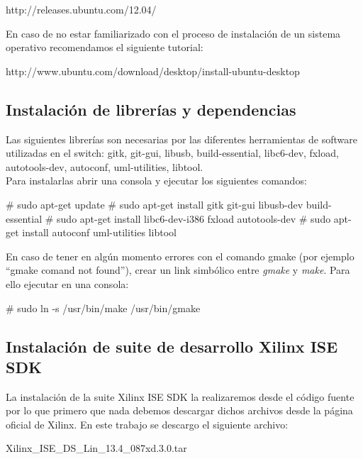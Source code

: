 \begin{center}
http://releases.ubuntu.com/12.04/
\end{center}  

En caso de no estar familiarizado con el proceso de instalación de un sistema operativo recomendamos el siguiente tutorial:

\begin{center}
http://www.ubuntu.com/download/desktop/install-ubuntu-desktop
\end{center}

\subsection{Instalación de librerías y dependencias}
Las siguientes librerías son necesarias por las diferentes herramientas de software utilizadas en el switch: gitk, git-gui, libusb, build-essential, libc6-dev, fxload, autotools-dev, autoconf, uml-utilities, libtool.\\

Para instalarlas abrir una consola y ejecutar los siguientes comandos:\\

\begin{bash}
# sudo apt-get update
# sudo apt-get install gitk git-gui libusb-dev build-essential 
# sudo apt-get install libc6-dev-i386 fxload autotools-dev
# sudo apt-get install autoconf uml-utilities libtool
\end{bash}

En caso de tener en algún momento errores con el comando gmake (por ejemplo “gmake comand not found”), crear un link simbólico entre \textit{gmake} y \textit{make}. Para ello ejecutar en una consola:\\

\begin{bash}
# sudo ln -s /usr/bin/make /usr/bin/gmake
\end{bash}

\subsection{Instalación de suite de desarrollo Xilinx ISE SDK}

La instalación de la suite Xilinx ISE SDK la realizaremos desde el código fuente por lo que primero que nada debemos descargar dichos archivos desde la página oficial de Xilinx. En este trabajo se descargo el siguiente archivo:

\begin{center}
Xilinx\_ISE\_DS\_Lin\_13.4\_087xd.3.0.tar
\end{center}

